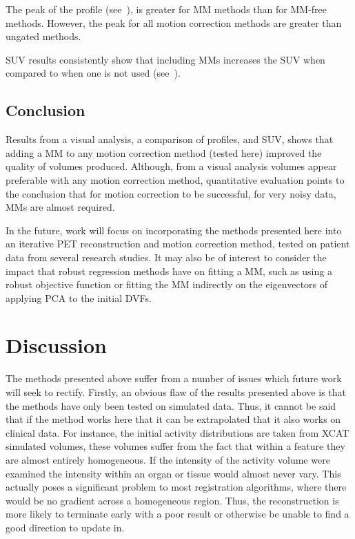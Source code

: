             The peak of the profile (see~), is greater for \gls{MM} methods than for \gls{MM}-free methods. However, the peak for all motion correction methods are greater than ungated methods.
             
            \gls{SUV} results consistently show that including \glspl{MM} increases the \gls{SUV} when compared to when one is not used (see~).
        
        \subsection{Conclusion} \label{sec:comparison_of_motion_correction_methods_incorporating_motion_modelling_for_pet_ct_using_a_single_breath_hold_attenuation_map_conclusions}
            Results from a visual analysis, a comparison of profiles, and \gls{SUV}, shows that adding a \gls{MM} to any motion correction method (tested here) improved the quality of volumes produced. Although, from a visual analysis volumes appear preferable with any motion correction method, quantitative evaluation points to the conclusion that for motion correction to be successful, for very noisy data, \glspl{MM} are almost required.
            
            In the future, work will focus on incorporating the methods presented here into an iterative \gls{PET} reconstruction and motion correction method, tested on patient data from several research studies. It may also be of interest to consider the impact that robust regression methods have on fitting a \gls{MM}, such as using a robust objective function or fitting the \gls{MM} indirectly on the eigenvectors of applying \gls{PCA} to the initial \glspl{DVF}.
    
    \section{Discussion} \label{sec:initial_motion_correction_using_basic_reconstruction_and_gating_methods_with_less_challenging_data_discussion}
        The methods presented above suffer from a number of issues which future work will seek to rectify. Firstly, an obvious flaw of the results presented above is that the methods have only been tested on simulated data. Thus, it cannot be said that if the method works here that it can be extrapolated that it also works on clinical data. For instance, the initial activity distributions are taken from \gls{XCAT} simulated volumes, these volumes suffer from the fact that within a feature they are almost entirely homogeneous. If the intensity of the activity volume were examined the intensity within an organ or tissue would almost never vary. This actually poses a significant problem to most registration algorithms, where there would be no gradient across a homogeneous region. Thus, the reconstruction is more likely to terminate early with a poor result or otherwise be unable to find a good direction to update in.
        
